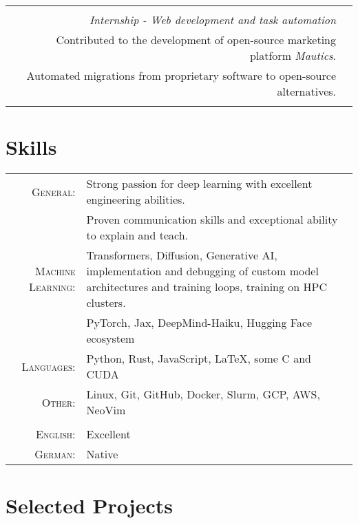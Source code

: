 \documentclass[11pt]{article}
\newcommand{\tabitem}{{\textbullet}~}
\begin{document}
\begin{tabular}{r|l}
    \begin{tabularx}{0.8\textwidth}{X}
        \textsc{Padberg \& Partners} \\

        \emph{Internship - Web development and task automation} \\

        \tabitem Contributed to the development of open-source marketing
        platform \textit{Mautics}. \\
        \tabitem Automated migrations from proprietary software to open-source
        alternatives. \\

    \end{tabularx}

\end{tabular}

\section{Skills}

\begin{tabularx}{\textwidth}{rX}
    \textsc{General:} & Strong passion for deep learning with excellent
    engineering abilities. \\
    & Proven communication skills and exceptional ability
    to explain and teach. \\
    \textsc{Machine Learning:} & Transformers, Diffusion,
                                 Generative AI, implementation and debugging of
                                 custom model architectures and training loops,
                                 training on HPC clusters. \\
                               & PyTorch, Jax, DeepMind-Haiku, Hugging Face ecosystem \\
    \textsc{Languages:} & Python, Rust, JavaScript, LaTeX, some C and CUDA \\
    \textsc{Other:} & Linux, Git, GitHub, Docker, Slurm, GCP, AWS, NeoVim \\

    \multicolumn{2}{c}{} \\

    \textsc{English:} & Excellent \\
    \textsc{German:}  & Native \\

\end{tabularx}

\section{Selected Projects}
\end{document}
